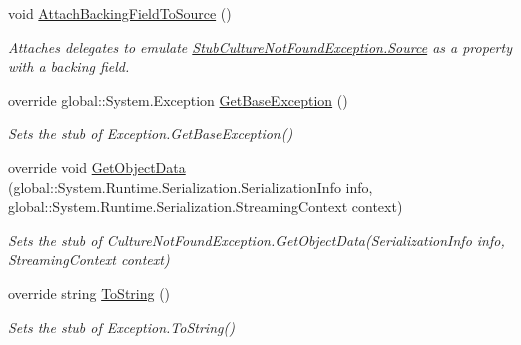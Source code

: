 \begin{DoxyCompactItemize}
void \hyperlink{class_system_1_1_globalization_1_1_fakes_1_1_stub_culture_not_found_exception_a388833b74149679808f153b0639265e6}{Attach\-Backing\-Field\-To\-Source} ()
\begin{DoxyCompactList}\small\item\em Attaches delegates to emulate \hyperlink{class_system_1_1_globalization_1_1_fakes_1_1_stub_culture_not_found_exception_a42444ecc64dd6afe8d23655cd12aeb3f}{Stub\-Culture\-Not\-Found\-Exception.\-Source} as a property with a backing field.\end{DoxyCompactList}\item 
override global\-::\-System.\-Exception \hyperlink{class_system_1_1_globalization_1_1_fakes_1_1_stub_culture_not_found_exception_a58d843fbf8f1cdd64d4ec97a3560987b}{Get\-Base\-Exception} ()
\begin{DoxyCompactList}\small\item\em Sets the stub of Exception.\-Get\-Base\-Exception()\end{DoxyCompactList}\item 
override void \hyperlink{class_system_1_1_globalization_1_1_fakes_1_1_stub_culture_not_found_exception_ab23bb51bd97d48f0b11738a40c654877}{Get\-Object\-Data} (global\-::\-System.\-Runtime.\-Serialization.\-Serialization\-Info info, global\-::\-System.\-Runtime.\-Serialization.\-Streaming\-Context context)
\begin{DoxyCompactList}\small\item\em Sets the stub of Culture\-Not\-Found\-Exception.\-Get\-Object\-Data(\-Serialization\-Info info, Streaming\-Context context)\end{DoxyCompactList}\item 
override string \hyperlink{class_system_1_1_globalization_1_1_fakes_1_1_stub_culture_not_found_exception_a4fd7977cf9ec8c2c86c22d9c973d4520}{To\-String} ()
\begin{DoxyCompactList}\small\item\em Sets the stub of Exception.\-To\-String()\end{DoxyCompactList}\end{DoxyCompactItemize}
